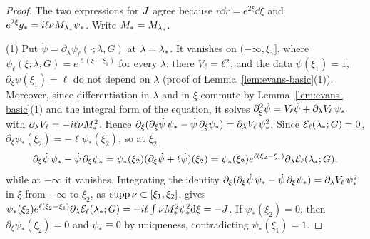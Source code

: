 \begin{proof}
The two expressions for $J$ agree because $r\dd r=e^{2\xi}\dd\xi$ and
$e^{2\xi}g_*=i\ell \nu M_{\lambda_*}\psi_*$. Write $M_*=M_{\lambda_*}$.

(1) Put $\dot\psi=\partial_\lambda\psi_\ell(\cdot;\lambda,G)$ at $\lambda=\lambda_*$. It
vanishes on $(-\infty,\xi_1]$, where $\psi_\ell(\xi;\lambda,G)=e^{\ell(\xi-\xi_1)}$ for
every $\lambda$: there $V_\ell=\ell^2$, and the data $\psi(\xi_1)=1$,
$\partial_\xi\psi(\xi_1)=\ell$ do not depend on $\lambda$ (proof of
Lemma~\ref{lem:evans-basic}(1)). Moreover, since differentiation in $\lambda$ and in $\xi$
commute by Lemma~\ref{lem:evans-basic}(1) and the integral form of the equation, it
solves $\partial_\xi^2\dot\psi=V_\ell\dot\psi+\partial_\lambda V_\ell\,\psi_*$ with
$\partial_\lambda V_\ell=-i\ell \nu M_*^2$. Hence
$\partial_\xi(\partial_\xi\dot\psi\,\psi_*-\dot\psi\,\partial_\xi\psi_*)=\partial_\lambda V_\ell\,\psi_*^2$. Since
$\mathcal{E}_\ell(\lambda_*;G)=0$, $\partial_\xi\psi_*(\xi_2)=-\ell\psi_*(\xi_2)$, so at $\xi_2$
\[
\partial_\xi\dot\psi\,\psi_*-\dot\psi\,\partial_\xi\psi_*=\psi_*(\xi_2)(\partial_\xi\dot\psi+\ell\dot\psi)(\xi_2)
=\psi_*(\xi_2)e^{\ell(\xi_2-\xi_1)}\partial_\lambda\mathcal{E}_\ell(\lambda_*;G),
\]
while at $-\infty$ it vanishes. Integrating the identity
$\partial_\xi(\partial_\xi\dot\psi\,\psi_*-\dot\psi\,\partial_\xi\psi_*)=\partial_\lambda V_\ell\,\psi_*^2$
in $\xi$ from $-\infty$ to $\xi_2$, as $\operatorname{supp} \nu\subset[\xi_1,\xi_2]$, gives $\psi_*(\xi_2)e^{\ell(\xi_2-\xi_1)}\allowbreak\partial_\lambda\mathcal{E}_\ell(\lambda_*;G)
=-i\ell\int \nu M_*^2\psi_*^2\dd\xi=-J$.
If $\psi_*(\xi_2)=0$, then $\partial_\xi\psi_*(\xi_2)=0$ and $\psi_*\equiv0$ by uniqueness,
contradicting $\psi_*(\xi_1)=1$.


\end{proof}
